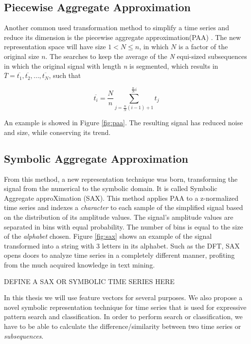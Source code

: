 \subsection{Piecewise Aggregate Approximation}
\label{subsec:paa}

Another common used transformation method to simplify a time series and reduce its dimension is the piecewise aggregate approximation(PAA) \cite{paa}. The new representation space will have size $1 < N \leq n$, in which $N$ is a factor of the original size $n$. The searches to keep the average of the \textit{N} equi-sized subsequences in which the original signal with length \textit{n} is segmented, which results in $\overline{T} = \overline{t_1}, \overline{t_2}, ...,\overline{t_N}$, such that \cite{paa}

\begin{equation}
\overline{t_i} = \frac{N}{n} \sum^{\frac{n}{N}i}_{j=\frac{n}{N}(i-1)+1} t_j
\end{equation}

An example is showed in Figure \ref{fig:paa}. The resulting signal has reduced noise and size, while conserving its trend.

\subsection{Symbolic Aggregate Approximation}
\label{subsec:sax}

From this method, a new representation technique was born, transforming the signal from the numerical to the symbolic domain. It is called Symbolic Aggregate approXimation (SAX). This method applies PAA to a z-normalized time series and indexes a \textit{character} to each sample of the simplified signal based on the distribution of its amplitude values. The signal's amplitude values are separated in bins with equal probability. The number of bins is equal to the size of the \textit{alphabet} chosen. Figure \ref{fig:sax} shows an example of the signal transformed into a string with 3 letters in its alphabet. Such as the DFT, SAX opens doors to analyze time series in a completely different manner, profiting from the much acquired knowledge in text mining.

DEFINE A SAX OR SYMBOLIC TIME SERIES HERE

In this thesis we will use feature vectors for several purposes. We also propose a novel symbolic representation technique for time series that is used for expressive pattern search and classification. In order to perform search or classification, we have to be able to calculate the difference/similarity between two time series or \textit{subsequences}.

